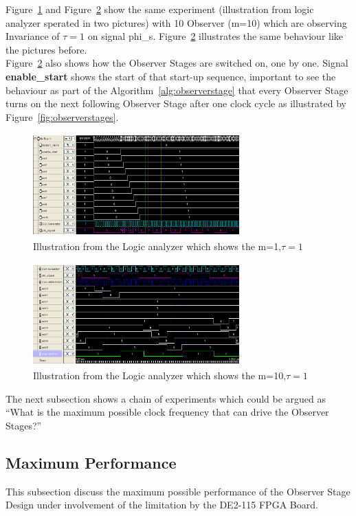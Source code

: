 Figure~\ref{fig:logicanalyzer:m10:t1:1} and Figure~\ref{fig:logicanalyzer:m10:t1:2} show the same experiment (illustration from logic analyzer sperated in two pictures) 
with 10 Observer (m=10) which are observing Invariance of $\tau = 1$ on signal phi\_s. 
Figure~\ref{fig:logicanalyzer:m10:t1:2} illustrates the same behaviour like the pictures before. \\
Figure~\ref{fig:logicanalyzer:m10:t1:2} also shows how the Observer Stages are switched on, one by one. 
Signal \textbf{enable\_start} shows the start of that start-up sequence, important to see the behaviour as part of the Algorithm~\ref{alg:observerstage} that 
every Observer Stage turns on the next following Observer Stage after one clock cycle as illustrated by Figure~\ref{fig:observerstages}. 
\begin{figure}[]
\centering
\includegraphics[width=300px,height=150px]{../../pictures/Logicanalyzer/10_Observer_Tau_1_2.png}
\caption[Logicanalyzer m=10,$\tau = 1$]{Illustration from the Logic analyzer which shows the m=1,$\tau = 1$}
\label{fig:logicanalyzer:m10:t1:1}
\end{figure}


\begin{figure}[]
\centering
\includegraphics[width=300px,height=150px]{../../pictures/Logicanalyzer/10_Observer_Tau_1_1.png}
\caption[Logicanalyzer m=10,$\tau = 1$]{Illustration from the Logic analyzer which shows the m=10,$\tau = 1$}
\label{fig:logicanalyzer:m10:t1:2}
\end{figure}

The next subsection shows a chain of experiments which could be argued as ``What is the maximum possible clock frequency that can drive the Observer Stages?''

\subsection{Maximum Performance}
\label{chapter:4:section:3:subsection:2}
This subsection discuss the maximum possible performance of the Observer Stage Design under involvement of the limitation by the DE2-115 FPGA Board.





